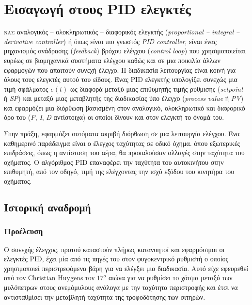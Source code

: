 


\section{Εισαγωγή στους PID ελεγκτές}

\lettrine[findent=2pt]{}{νας} αναλογικός -- ολοκληρωτικός -- διαφορικός ελεγκτής (\emph{proportional -- integral -- derivative controller}) ή όπως είναι πιο γνωστός \emph{PID controller}, είναι ένας μηχανισμός ανάδρασης (\emph{feedback}) βρόχου ελέγχου (\emph{control loop}) που χρησιμοποιείται ευρέως σε βιομηχανικά συστήματα ελέγχου καθώς και σε μια ποικιλία άλλων εφαρμογών που απαιτούν συνεχή έλεγχο. Η διαδικασία λειτουργίας είναι κοινή για όλους τους ελεγκτές αυτού του είδους. Ένας PID ελεγκτής υπολογίζει συνεχώς μια τιμή σφάλματος $e(t)$ ως διαφορά μεταξύ μιας επιθυμητής τιμής ρύθμισης (\emph{setpoint} ή \emph{SP}) και μεταξύ μιας μεταβλητής της διαδικασίας ύπο έλεγχο (\emph{process value} ή \emph{PV}) και εφαρμόζει μια διόρθωση βασισμένη στον αναλογικό, ολοκληρωτικό και διαφορικό όρο του (\emph{P}, \emph{I}, \emph{D} αντίστοιχα) οι οποίοι δίνουν και στον ελεγκτή το όνομά του.

Στην πράξη, εφαρμόζει αυτόματα ακριβή διόρθωση σε μια λειτουργία ελέγχου. Ένα καθημερινό παράδειγμα είναι ο έλεγχος ταχύτητας σε οδικό όχημα. όπου εξωτερικές επιδράσεις, όπως η αντίσταση του αέρα, θα προκαλούσαν αλλαγές στην ταχύτητα του οχήματος. Ο αλγόριθμος PID επαναφέρει την ταχύτητα του αυτοκινήτου στην επιθυμητή, από τον οδηγό, τιμή της ελέγχοντας την ισχύ εξόδου του κινητήρα του οχήματος.

\subsection{Ιστορική αναδρομή}

\subsubsection{Προέλευση}
Ο συνεχής έλεγχος, προτού καταστούν πλήρως κατανοητοί και εφαρμόσιμοι οι ελεγκτές PID, έχει μία από τις πηγές του στον φυγοκεντρικό ρυθμιστή ο οποίος χρησιμοποιεί περιστρεφόμενα βάρη για να ελέγξει μια διαδικασία. Αυτό είχε εφευρεθεί από τον Christian Huygens τον $17^o$ αιώνα για να ρυθμίσει το χάσμα μεταξύ των μυλόπετρων στους ανεμόμυλους ανάλογα με την ταχύτητα περιστροφής και έτσι να αντισταθμίσει την μεταβλητή ταχύτητα της τροφοδότησης των σιτηρών.

